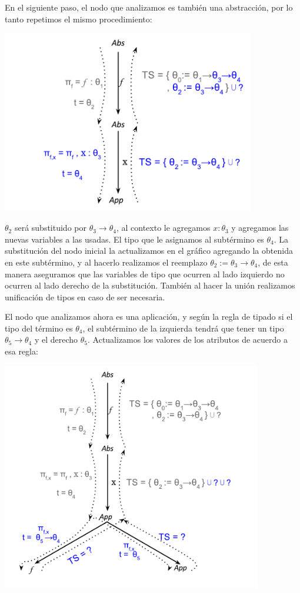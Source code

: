 \documentclass[a4paper,10pt]{article}
\begin{document}
   
   
   En el siguiente paso, el nodo que analizamos es también una abstracción, por lo tanto repetimos el mismo procedimiento:
   
\begin{center}
\includegraphics[height=8cm]{./segundo.pdf}
\end{center}

  \noindent $\theta_2$ será substituido por $\theta_3 \rightarrow \theta_4$, al contexto le agregamos $x:\theta_3$ y agregamos
  las nuevas variables a las usadas. El tipo que le asignamos al subtérmino es $\theta_4$. La substitución del nodo inicial
  la actualizamos en el gráfico agregando la obtenida en este subtérmino, y al hacerlo realizamos el reemplazo 
  $\theta_2 := \theta_3 \rightarrow \theta_4$, de esta manera aseguramos que las variables de tipo que ocurren al lado
  izquierdo no ocurren al lado derecho de la substitución. También al hacer la unión realizamos unificación de tipos en
  caso de ser necesaria.
  \medskip
  
  El nodo que analizamos ahora es una aplicación, y según la regla de tipado si el tipo del término es $\theta_4$,
  el subtérmino de la izquierda tendrá que tener un tipo $\theta_5 \rightarrow \theta_4$ y el derecho
  $\theta_5$. Actualizamos los valores de los atributos de acuerdo a esa regla:
  
  \begin{center}
\includegraphics[height=10cm]{./tercero.pdf}
\end{center}
\end{document}
